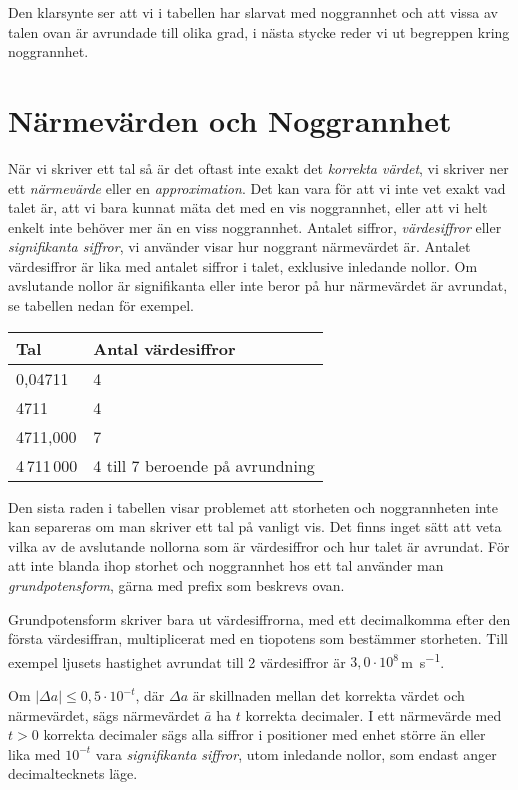 \bigskip

Den klarsynte ser att vi i tabellen har slarvat med noggrannhet och att
vissa av talen ovan är avrundade till olika grad, i nästa stycke reder
vi ut begreppen kring noggrannhet.

\section{Närmevärden och Noggrannhet}

När vi skriver ett tal så är det oftast inte exakt det \emph{korrekta värdet},
vi skriver ner ett \emph{närmevärde} eller en \emph{approximation}.
Det kan vara för att vi inte vet exakt vad talet är, att vi bara kunnat mäta det
med en vis noggrannhet, eller att vi helt enkelt inte behöver mer än en viss
noggrannhet.
Antalet siffror, \emph{värdesiffror} eller \emph{signifikanta siffror}, vi
använder visar hur noggrant närmevärdet är.
Antalet värdesiffror är lika med antalet siffror i talet, exklusive inledande
nollor.
Om avslutande nollor är signifikanta eller inte beror på hur närmevärdet är
avrundat, se tabellen nedan för exempel.

\bigskip
\begin{centering}
\begin{tabular}{|l|l|}
\hline
Tal & Antal värdesiffror \\
\hline
0,04711 & 4\\
4711 & 4 \\
4711,000 & 7 \\
4\,711\,000 & 4 till 7 beroende på avrundning \\
\hline
\end{tabular}
\end{centering}
\bigskip

Den sista raden i tabellen visar problemet att storheten och noggrannheten inte
kan separeras om man skriver ett tal på vanligt vis.
Det finns inget sätt att veta vilka av de avslutande nollorna som är
värdesiffror och hur talet är avrundat.
För att inte blanda ihop storhet och noggrannhet hos ett tal använder man
\emph{grundpotensform}, gärna med prefix som beskrevs ovan.

Grundpotensform skriver bara ut värdesiffrorna, med ett decimalkomma efter den
första värdesiffran, multiplicerat med en tiopotens som bestämmer storheten.
Till exempel ljusets hastighet avrundat till 2 värdesiffror är
$3,0 \cdot 10^8$\,\unit{\metre\per\second}.

Om $|\Delta a|\leq 0,5\cdot 10^{-t}$, där $\Delta a$ är skillnaden mellan det
korrekta värdet och närmevärdet, sägs närmevärdet $\bar {a}$ ha $t$ korrekta
decimaler.
I ett närmevärde med $t>0$ korrekta decimaler sägs alla siffror i
positioner med enhet större än eller lika med $10^{-t}$ vara
\emph{signifikanta siffror}, utom inledande nollor, som endast anger
decimaltecknets läge.

